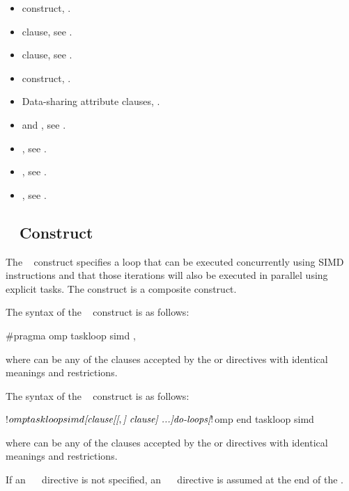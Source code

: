 \crossreferences
\begin{itemize}
\item {} construct, .
\item {} clause, see .
\item {} clause, see .
\item {} construct, .
\item Data-sharing attribute clauses, .
\item {} and , see
  .
\item {}, see .
\item {}, see
.
\item {}, see 
.

\end{itemize}






%
%
\subsection{~ Construct}
\label{subsec:taskloop simd Construct}
\summary
The ~ construct specifies a loop that can be
executed concurrently using SIMD instructions and that those iterations
will also be executed in parallel using explicit tasks. The 
 construct is a composite construct.

\syntax
\begin{ccppspecific}
The syntax of the ~ construct is as follows:
\begin{ompcPragma}
#pragma omp taskloop simd \plc{[clause[[},\plc{] clause] ...] new-line}
\end{ompcPragma}
where  can be any of the clauses accepted by the  or  directives with identical meanings and restrictions.
\end{ccppspecific}
\begin{fortranspecific}
The syntax of the ~ construct is as follows:
\begin{ompfPragma}
!$omp taskloop simd \plc{[clause[[},\plc{] clause] ...]}
    \plc{do-loops}
\plc{[}!$omp end taskloop simd\plc{]}
\end{ompfPragma}
where  can be any of the clauses accepted by the  or  directives with identical meanings and restrictions.

If an ~~ directive is not specified, an ~~ directive is assumed at the end of the .
\end{fortranspecific}


